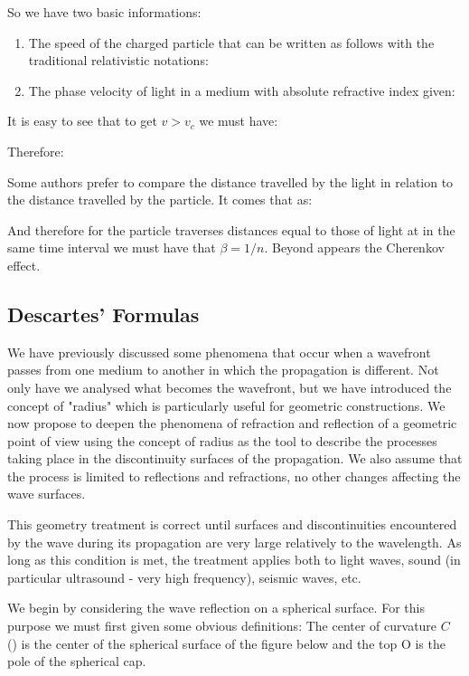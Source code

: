 	So we have two basic informations:
	\begin{enumerate}
		\item The speed of the charged particle that can be written as follows with the traditional relativistic notations:
		

		\item The phase velocity of light in a medium with absolute refractive index given:
		
	\end{enumerate}
	It is easy to see that to get $v>v_c$ we must have:
	
	Therefore:
	
	Some authors prefer to compare the distance travelled by the light in relation to the distance travelled by the particle. It comes that as:
	
	And therefore for the particle traverses distances equal to those of light at in the same time interval we must have that $\beta=1/n$. Beyond appears the Cherenkov effect.
	
	\pagebreak
	\subsection{Descartes' Formulas}
	We have previously discussed some phenomena that occur when a wavefront passes from one medium to another in which the propagation is different. Not only have we analysed what becomes the wavefront, but we have introduced the concept of "radius" which is particularly useful for geometric constructions. We now propose to deepen the phenomena of refraction and reflection of a geometric point of view using the concept of radius as the tool to describe the processes taking place in the discontinuity surfaces of the propagation. We also assume that the process is limited to reflections and refractions, no other changes affecting the wave surfaces.

	This geometry treatment is correct until surfaces and discontinuities encountered by the wave during its propagation are very large relatively to the wavelength. As long as this condition is met, the treatment applies both to light waves, sound (in particular ultrasound - very high frequency), seismic waves, etc.

	We begin by considering the wave reflection on a spherical surface. For this purpose we must first given some obvious definitions: The center of curvature $C$ () is the center of the spherical surface of the figure below and the top O is the pole of the spherical cap.
	

